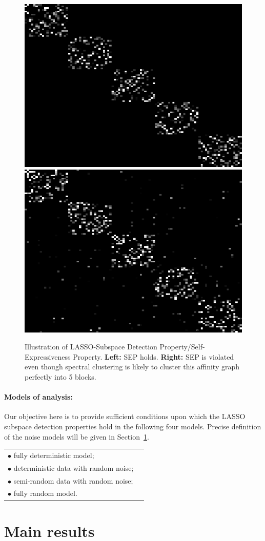 \documentclass[twoside,11pt]{article}
\numberwithin{equation}{section}
\begin{document}
\begin{figure}
  \centering
  \includegraphics[width=0.35\linewidth]{pics/SEP.png}
  \includegraphics[width=0.35\linewidth]{pics/ViolateSEP.png}\\
  \caption{Illustration of LASSO-Subspace Detection Property/Self-Expressiveness Property. \textbf{Left:} SEP holds. \textbf{Right:} SEP is violated even though spectral clustering is likely to cluster this affinity graph perfectly into 5 blocks.}\label{fig:SEP}
\end{figure}

\paragraph{Models of analysis: }
Our objective here is to provide sufficient conditions upon which the LASSO subspace detection properties hold in the following four models. Precise definition of the noise models will be given in Section~\ref{sec:main}.

\begin{tabular}{ll}
  $\bullet$ fully deterministic model;\\
  $\bullet$ deterministic data with random noise;\\
  $\bullet$ semi-random data with random noise;\\
  $\bullet$ fully random model.
\end{tabular}




\section{Main results}\label{sec:main}
\end{document}
